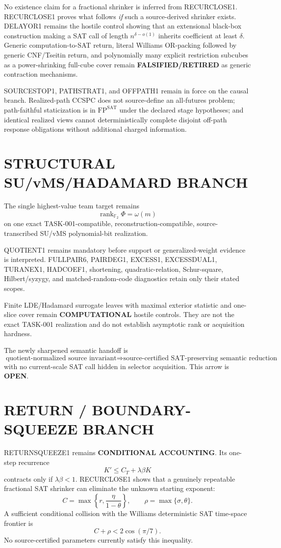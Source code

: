 \documentclass[11pt]{article}
\begin{document}
No existence claim for a fractional shrinker is inferred from RECURCLOSE1. RECURCLOSE1 proves what follows \emph{if} such a source-derived shrinker exists. DELAYOR1 remains the hostile control showing that an extensional black-box construction making a SAT call of length \(n^{\delta-o(1)}\) inherits coefficient at least \(\delta\). Generic computation-to-SAT return, literal Williams OR-packing followed by generic CNF/Tseitin return, and polynomially many explicit restriction subcubes as a power-shrinking full-cube cover remain \textbf{FALSIFIED/RETIRED} as generic contraction mechanisms.

SOURCESTOP1, PATHSTRAT1, and OFFPATH1 remain in force on the causal branch. Realized-path CCSPC does not source-define an all-futures problem; path-faithful staticization is in \(\mathrm{FP}^{\mathrm{SAT}}\) under the declared stage hypotheses; and identical realized views cannot deterministically complete disjoint off-path response obligations without additional charged information.

\section*{STRUCTURAL SU/vMS/HADAMARD BRANCH}
The single highest-value team target remains
\[
\boxed{\operatorname{rank}_{\mathbb F_2}\Phi=\omega(m)}
\]
on one exact TASK-001-compatible, reconstruction-compatible, source-transcribed SU/vMS polynomial-bit realization.

QUOTIENT1 remains mandatory before support or generalized-weight evidence is interpreted. FULLPAIR6, PAIRDEG1, EXCESS1, EXCESSDUAL1, TURANEX1, HADCOEF1, shortening, quadratic-relation, Schur-square, Hilbert/syzygy, and matched-random-code diagnostics retain only their stated scopes.

Finite LDE/Hadamard surrogate leaves with maximal exterior statistic and one-slice cover remain \textbf{COMPUTATIONAL} hostile controls. They are not the exact TASK-001 realization and do not establish asymptotic rank or acquisition hardness.

The newly sharpened semantic handoff is
\[
\boxed{
\text{quotient-normalized source invariant}
\Longrightarrow
\text{source-certified SAT-preserving semantic reduction}
}
\]
with no current-scale SAT call hidden in selector acquisition. This arrow is \textbf{OPEN}.

\section*{RETURN / BOUNDARY-SQUEEZE BRANCH}
RETURNSQUEEZE1 remains \textbf{CONDITIONAL ACCOUNTING}. Its one-step recurrence
\[
K'\le C_T+\lambda\beta K
\]
contracts only if \(\lambda\beta<1\). RECURCLOSE1 shows that a genuinely repeatable fractional SAT shrinker can eliminate the unknown starting exponent:
\[
C=\max\left\{r,\frac{\eta}{1-\theta}\right\},
\qquad
\rho=\max\{\sigma,\theta\}.
\]
A sufficient conditional collision with the Williams deterministic SAT time-space frontier is
\[
C+\rho<2\cos(\pi/7).
\]
No source-certified parameters currently satisfy this inequality.
\end{document}
